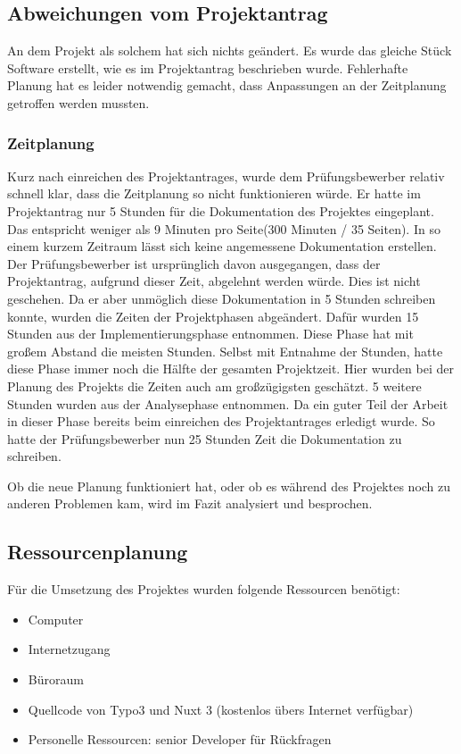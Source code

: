 \subsection{Abweichungen vom Projektantrag}
\label{sec:AbweichungenProjektantrag}

An dem Projekt als solchem hat sich nichts geändert. Es wurde das gleiche Stück Software erstellt, wie es im Projektantrag beschrieben wurde. Fehlerhafte Planung hat es leider notwendig gemacht, dass Anpassungen an der Zeitplanung getroffen werden mussten.


\subsubsection{Zeitplanung}
\label{sec:AbweichungenProjektantrag}

Kurz nach einreichen des Projektantrages, wurde dem Prüfungsbewerber relativ schnell klar, dass die Zeitplanung so nicht funktionieren würde. Er hatte im Projektantrag nur 5 Stunden für die Dokumentation des Projektes eingeplant. Das entspricht weniger als 9 Minuten pro Seite(300 Minuten / 35 Seiten). In so einem kurzem Zeitraum lässt sich keine angemessene Dokumentation erstellen. Der Prüfungsbewerber ist ursprünglich davon ausgegangen, dass der Projektantrag, aufgrund dieser Zeit, abgelehnt werden würde. Dies ist nicht geschehen. Da er aber unmöglich diese Dokumentation in 5 Stunden schreiben konnte, wurden die Zeiten der Projektphasen abgeändert. Dafür wurden 15 Stunden aus der Implementierungsphase entnommen. Diese Phase hat mit großem Abstand die meisten Stunden. Selbst mit Entnahme der Stunden, hatte diese Phase immer noch die Hälfte der gesamten Projektzeit. Hier wurden bei der Planung des Projekts die Zeiten auch am großzügigsten geschätzt. 5 weitere Stunden wurden aus der Analysephase entnommen. Da ein guter Teil der Arbeit in dieser Phase bereits beim einreichen des Projektantrages erledigt wurde. So hatte der Prüfungsbewerber nun 25 Stunden Zeit die Dokumentation zu schreiben.

Ob die neue Planung funktioniert hat, oder ob es während des Projektes noch zu anderen Problemen kam, wird im Fazit analysiert und besprochen.

\subsection{Ressourcenplanung}
\label{sec:Ressourcenplanung}

Für die Umsetzung des Projektes wurden folgende Ressourcen benötigt:
\begin{itemize}
	\item Computer
	\item Internetzugang
	\item Büroraum
	\item Quellcode von Typo3 und Nuxt 3 (kostenlos übers Internet verfügbar)
	\item Personelle Ressourcen: senior Developer für Rückfragen
\end{itemize}

